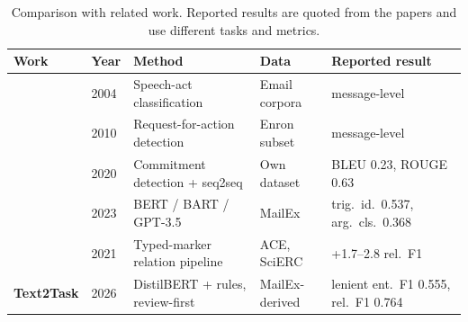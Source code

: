 \begin{table}[htbp]
\centering
\caption{Comparison with related work. Reported results are quoted from the papers and use different tasks and metrics.}
\label{tab:literature}
\footnotesize
\begin{tabularx}{\linewidth}{@{}p{30mm}p{8mm}LLp{30mm}@{}}
\toprule
Work & Year & Method & Data & Reported result \\
\midrule
\citet{cohen2004speechacts} & 2004 & Speech-act classification & Email corpora & message-level \\
\citet{lampert2010requests} & 2010 & Request-for-action detection & Enron subset & message-level \\
\citet{mukherjee2020smarttodo} & 2020 & Commitment detection + seq2seq & Own dataset & BLEU 0.23, ROUGE 0.63 \\
\citet{srivastava2023mailex} & 2023 & BERT / BART / GPT-3.5 & MailEx & trig.\ id.\ 0.537, arg.\ cls.\ 0.368 \\
\citet{zhong2021pure} & 2021 & Typed-marker relation pipeline & ACE, SciERC & +1.7--2.8 rel.\ F1 \\
\textbf{Text2Task} & 2026 & DistilBERT + rules, review-first & MailEx-derived & lenient ent.\ F1 0.555, rel.\ F1 0.764 \\
\bottomrule
\end{tabularx}
\end{table}
